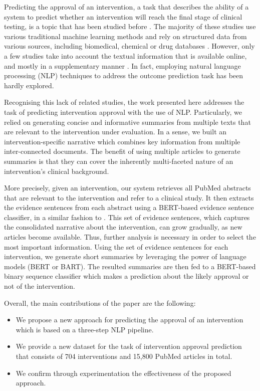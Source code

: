 \documentclass[11pt]{article}
\begin{document}
Predicting the approval of an intervention, a task that describes the ability of a system to predict whether an intervention will reach the final stage of clinical testing, is a topic that has been studied before \cite{gayvert2016data, lo2018machine}. The majority of these studies use various traditional machine learning methods and rely on structured data from various sources, including biomedical, chemical or drug databases \cite{munos2020improving, heinemann2016reflection}. However, only a few studies take into account the textual information that is available online, and mostly in a supplementary manner \cite{follett2019quantifying, geletta2019latent}. In fact, employing natural language processing (NLP) techniques to address the outcome prediction task has been hardly explored. 

Recognising this lack of related studies, the work presented here addresses the task of predicting intervention approval with the use of NLP. Particularly, we relied on generating concise and informative summaries from multiple texts that are relevant to the intervention under evaluation. In a sense, we built an intervention-specific narrative which combines key information from multiple inter-connected documents. The benefit of using multiple articles to generate summaries is that they can cover the inherently multi-faceted nature of an intervention's clinical background. 

More precisely, given an intervention, our system retrieves all PubMed abstracts that are relevant to the intervention and refer to a clinical study. It then extracts the evidence sentences from each abstract using a BERT-based evidence sentence classifier, in a similar fashion to \cite{deyoung2020evidence}. This set of evidence sentences, which captures the consolidated narrative about the intervention, can grow gradually, as new articles become available. Thus, further analysis is necessary in order to select the most important information. Using the set of evidence sentences for each intervention, we generate short summaries by leveraging the power of language models (BERT or BART). The resulted summaries are then fed to a BERT-based binary sequence classifier which makes a prediction about the likely approval or not of the intervention.


Overall, the main contributions of the paper are the following:
\begin{itemize}

    \item We propose a new approach for predicting the approval of an intervention which is based on a three-step NLP pipeline.
    \item We provide a new dataset for the task of intervention approval prediction that consists of 704 interventions and 15,800 PubMed articles in total. 
    \item We confirm through experimentation the effectiveness of the proposed approach.
\end{itemize}
\end{document}
